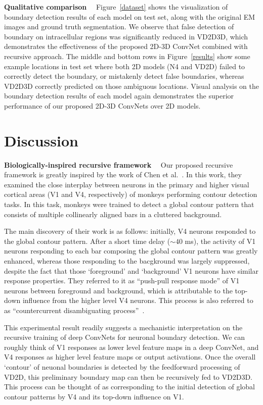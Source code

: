 \documentclass{article} %
\begin{document}
{\bf Qualitative comparison}$\quad$
Figure~\ref{dataset} shows the visualization of boundary detection results of each model on test set, along with the original EM images and ground truth segmentation. We observe that false detection of boundary on intracellular regions was significantly reduced in VD2D3D, which demonstrates the effectiveness of the proposed 2D-3D ConvNet combined with recursive approach. The middle and bottom rows in Figure~\ref{results} show some example locations in test set where both 2D models (N4 and VD2D) failed to correctly detect the boundary, or mistakenly detect false boundaries, whereas VD2D3D correctly predicted on those ambiguous locations. Visual analysis on the boundary detection results of each model again demonstrates the superior performance of our proposed 2D-3D ConvNets over 2D models.


\section{Discussion}
\label{discussion}

{\bf Biologically-inspired recursive framework}$\quad$
Our proposed recursive framework is greatly inspired by the work of Chen et al.~\cite{Chen2014}. In this work, they examined the close interplay between neurons in the primary and higher visual cortical areas (V1 and V4, respectively) of monkeys performing contour detection tasks. In this task, monkeys were trained to detect a global contour pattern that consists of multiple collinearly aligned bars in a cluttered background.

The main discovery of their work is as follows: initially, V4 neurons responded to the global contour pattern. After a short time delay (${\sim}40$ ms), the activity of V1 neurons responding to each bar composing the global contour pattern was greatly enhanced, whereas those responding to the bacgkround was largely suppressed, despite the fact that those `foreground' and `background' V1 neurons have similar response properties. They referred to it as ``push-pull response mode'' of V1 neurons between foreground and background, which is attributable to the top-down influence from the higher level V4 neurons.
This process is also referred to as ``countercurrent disambiguating process''~\cite{Chen2014}.

This experimental result readily suggests a mechanistic interpretation on the recursive training of deep ConvNets for neuronal boundary detection. We can roughly think of V1 responses as lower level feature maps in a deep ConvNet, and V4 responses as higher level feature maps or output activations. Once the overall `contour' of neuonal boundaries is detected by the feedforward processing of VD2D, this preliminary boundary map can then be recursively fed to VD2D3D. This process can be thought of as corresponding to the initial detection of global contour patterns by V4 and its top-down influence on V1.
\end{document}
